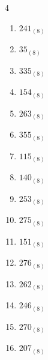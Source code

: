 \begin{multicols}{4}
\begin{enumerate}
  \item $241_{(8)}$

        \phantom{$=161$}

  \item $35_{(8)}$

        \phantom{$=29$}

  \item $335_{(8)}$

        \phantom{$=221$}

  \item $154_{(8)}$

        \phantom{$=108$}

  \item $263_{(8)}$

        \phantom{$=179$}

  \item $355_{(8)}$

        \phantom{$=237$}

  \item $115_{(8)}$

        \phantom{$=77$}

  \item $140_{(8)}$

        \phantom{$=96$}

  \item $253_{(8)}$

        \phantom{$=171$}

  \item $275_{(8)}$

        \phantom{$=189$}

\columnbreak %

  \item $151_{(8)}$

        \phantom{$=105$}

  \item $276_{(8)}$

        \phantom{$=190$}

  \item $262_{(8)}$

        \phantom{$=178$}

  \item $246_{(8)}$

        \phantom{$=166$}

  \item $270_{(8)}$

        \phantom{$=184$}

  \item $207_{(8)}$


\end{enumerate}
\end{multicols}
